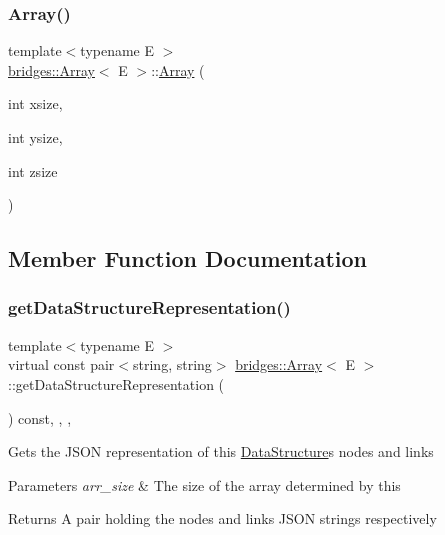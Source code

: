 \subsubsection{\texorpdfstring{Array()}{Array()}\hspace{0.1cm}{\footnotesize\ttfamily [5/5]}}
{\footnotesize\ttfamily template$<$typename E $>$ \\
\mbox{\hyperlink{classbridges_1_1_array}{bridges\+::\+Array}}$<$ E $>$\+::\mbox{\hyperlink{classbridges_1_1_array}{Array}} (\begin{DoxyParamCaption}\item[{int}]{xsize,  }\item[{int}]{ysize,  }\item[{int}]{zsize }\end{DoxyParamCaption})\hspace{0.3cm}{\ttfamily [inline]}}



\subsection{Member Function Documentation}
\mbox{\label{classbridges_1_1_array_ab039fc0b5dd5683bbdf0fe71fce9d317}} 
\subsubsection{\texorpdfstring{get\+Data\+Structure\+Representation()}{getDataStructureRepresentation()}}
{\footnotesize\ttfamily template$<$typename E $>$ \\
virtual const pair$<$string, string$>$ \mbox{\hyperlink{classbridges_1_1_array}{bridges\+::\+Array}}$<$ E $>$\+::get\+Data\+Structure\+Representation (\begin{DoxyParamCaption}{ }\end{DoxyParamCaption}) const\hspace{0.3cm}{\ttfamily [inline]}, {\ttfamily [final]}, {\ttfamily [override]}, {\ttfamily [virtual]}}

Gets the J\+S\+ON representation of this \mbox{\hyperlink{classbridges_1_1_data_structure}{Data\+Structure}}\textquotesingle{}s nodes and links


\begin{DoxyParams}{Parameters}
{\em arr\+\_\+size} & The size of the array determined by this \\
\hline
\end{DoxyParams}
\begin{DoxyReturn}{Returns}
A pair holding the nodes and links J\+S\+ON strings respectively 
\end{DoxyReturn}


